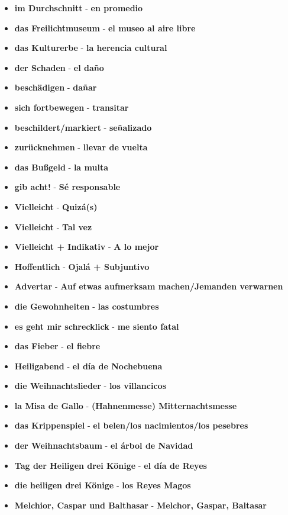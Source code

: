 \documentclass{article}
\begin{document}
\begin{multicols}{2}
\begin{itemize}
		\item{\textbf{im Durchschnitt} - \textbf{en promedio}}
		\item{\textbf{das Freilichtmuseum} - \textbf{el museo al aire libre}}
		\item{\textbf{das Kulturerbe} - \textbf{la herencia cultural}}
		\item{\textbf{der Schaden} - \textbf{el daño}}
		\item{\textbf{beschädigen} - \textbf{dañar}}
		\item{\textbf{sich fortbewegen} - \textbf{transitar}}
		\item{\textbf{beschildert/markiert} - \textbf{señalizado}}
		\item{\textbf{zurücknehmen} - \textbf{llevar de vuelta}}
		\item{\textbf{das Bußgeld} - \textbf{la multa}}
		\item{\textbf{gib acht!} - \textbf{Sé responsable}}
		\item{\textbf{Vielleicht} - \textbf{Quizá(s)}}
		\item{\textbf{Vielleicht} - \textbf{Tal vez}}
		\item{\textbf{Vielleicht + Indikativ} - \textbf{A lo mejor}}
		\item{\textbf{Hoffentlich} - \textbf{Ojalá + Subjuntivo}}
		\item{\textbf{Advertar} - \textbf{Auf etwas aufmerksam machen/Jemanden verwarnen}}
		\item{\textbf{die Gewohnheiten} - \textbf{las costumbres}}
		\item{\textbf{es geht mir schrecklick} - \textbf{me siento fatal}}
		\item{\textbf{das Fieber} - \textbf{el fiebre}}
		\item{\textbf{Heiligabend} - \textbf{el día de Nochebuena}}
		\item{\textbf{die Weihnachtslieder} - \textbf{los villancicos}}
		\item{\textbf{la Misa de Gallo} - \textbf{(Hahnenmesse) Mitternachtsmesse}}
		\item{\textbf{das Krippenspiel} - \textbf{el belen/los nacimientos/los pesebres}}
		\item{\textbf{der Weihnachtsbaum} - \textbf{el árbol de Navidad}}
		\item{\textbf{Tag der Heiligen drei Könige} - \textbf{el día de Reyes}}
		\item{\textbf{die heiligen drei Könige} - \textbf{los Reyes Magos}}
		\item{\textbf{Melchior, Caspar und Balthasar} - \textbf{Melchor, Gaspar, Baltasar}}

\end{itemize}
\end{multicols}
\end{document}
